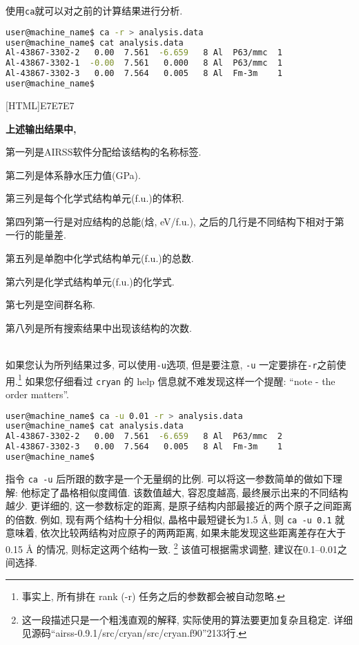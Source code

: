 \documentclass[a4paper, 10pt]{article}
\begin{document}
使用\verb|ca|就可以对之前的计算结果进行分析.
\begin{lstlisting}[language={bash}]
user@machine_name$ ca -r > analysis.data
user@machine_name$ cat analysis.data
Al-43867-3302-2   0.00  7.561  -6.659   8 Al  P63/mmc  1
Al-43867-3302-1  -0.00  7.561   0.000   8 Al  P63/mmc  1
Al-43867-3302-3   0.00  7.564   0.005   8 Al  Fm-3m    1
user@machine_name$
\end{lstlisting}

\noindent{}[HTML]{E7E7E7}{\parbox{\textwidth}{%
\noindent \textbf{上述输出结果中,}
\begin{maineu}
  \item 第一列是AIRSS软件分配给该结构的名称标签.
  \item 第二列是体系静水压力值(GPa).
  \item 第三列是每个化学式结构单元(f.u.)的体积.
  \item 第四列第一行是对应结构的总能(焓, eV/f.u.), 之后的几行是不同结构下相对于第一行的能量差.
  \item 第五列是单胞中化学式结构单元(f.u.)的总数.
  \item 第六列是化学式结构单元(f.u.)的化学式.
  \item 第七列是空间群名称.
  \item 第八列是所有搜索结果中出现该结构的次数.
\end{maineu}}}\\

如果您认为所列结果过多, 可以使用\verb|-u|选项, 但是要注意, \verb|-u| 一定要排在\verb|-r|之前使用.\footnote{事实上, 所有排在 rank (-r) 任务之后的参数都会被自动忽略.} 如果您仔细看过 \verb|cryan| 的 help 信息就不难发现这样一个提醒: ``note - the order matters''.
\begin{lstlisting}[language={bash}]
user@machine_name$ ca -u 0.01 -r > analysis.data
user@machine_name$ cat analysis.data
Al-43867-3302-2   0.00  7.561  -6.659   8 Al  P63/mmc  2
Al-43867-3302-3   0.00  7.564   0.005   8 Al  Fm-3m    1
user@machine_name$
\end{lstlisting}

指令 \verb|ca -u| 后所跟的数字是一个无量纲的比例. 可以将这一参数简单的做如下理解:  他标定了晶格相似度阈值. 该数值越大, 容忍度越高, 最终展示出来的不同结构越少. 更详细的, 这一参数标定的距离, 是原子结构内部最接近的两个原子之间距离的倍数. 例如, 现有两个结构十分相似, 晶格中最短键长为1.5 \r{A}, 则 \verb|ca -u 0.1| 就意味着, 依次比较两结构对应原子的两两距离, 如果未能发现这些距离差存在大于0.15 \r{A} 的情况, 则标定这两个结构一致. \footnote{这一段描述只是一个粗浅直观的解释, 实际使用的算法要更加复杂且稳定. 详细见源码``airss-0.9.1/src/cryan/src/cryan.f90''2133行.} 该值可根据需求调整, 建议在0.1--0.01之间选择.
\end{document}
